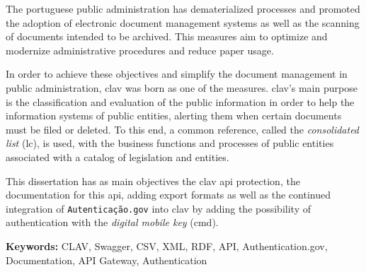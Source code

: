 The portuguese public administration has dematerialized processes and promoted the adoption of electronic document management systems as well as the scanning of documents intended to be archived. This measures aim to optimize and modernize administrative procedures and reduce paper usage.

In order to achieve these objectives and simplify the document management in public administration, \acrshort{clav} was born as one of the measures. \acrshort{clav}'s main purpose is the classification and evaluation of the public information in order to help the information systems of public entities, alerting them when certain documents must be filed or deleted. To this end, a common reference, called the \textit{consolidated list} (\acrlong{lc}), is used, with the business functions and processes of public entities associated with a catalog of legislation and entities.

This dissertation has as main objectives the \acrshort{clav} \acrshort{api} protection, the documentation for this \acrshort{api}, adding export formats as well as the continued integration of \texttt{Autenticação.gov} into \acrshort{clav} by adding the possibility of authentication with the \textit{digital mobile key} (\acrlong{cmd}).

\vspace{1cm}

\textbf{Keywords:} CLAV, Swagger, CSV, XML, RDF, API, Authentication.gov, Documentation, API Gateway, Authentication
